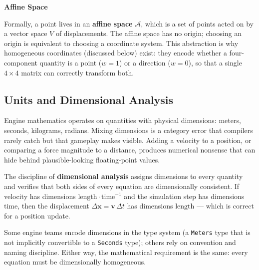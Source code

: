 \documentclass[
  11pt,
  letterpaper,
  DIV=11,
  numbers=noendperiod,
  twoside,
  open=right]{scrreprt}
\begin{document}
\begin{tcolorbox}[enhanced jigsaw, arc=.35mm, bottomrule=.15mm, breakable, colback=white, colframe=quarto-callout-note-color-frame, left=2mm, leftrule=.75mm, opacityback=0, rightrule=.15mm, toprule=.15mm]
\begin{minipage}[t]{5.5mm}
\textcolor{quarto-callout-note-color}{\faInfo}
\end{minipage}%
\begin{minipage}[t]{\textwidth - 5.5mm}

\vspace{-3mm}\textbf{Affine Space}\vspace{3mm}

Formally, a point lives in an \textbf{affine space} \(\mathcal{A}\),
which is a set of points acted on by a vector space \(V\) of
displacements. The affine space has no origin; choosing an origin is
equivalent to choosing a coordinate system. This abstraction is why
homogeneous coordinates (discussed below) exist: they encode whether a
four-component quantity is a point (\(w = 1\)) or a direction
(\(w = 0\)), so that a single \(4 \times 4\) matrix can correctly
transform both.

\end{minipage}%
\end{tcolorbox}

\subsection{Units and Dimensional
Analysis}\label{units-and-dimensional-analysis}

Engine mathematics operates on quantities with physical dimensions:
meters, seconds, kilograms, radians. Mixing dimensions is a category
error that compilers rarely catch but that gameplay makes visible.
Adding a velocity to a position, or comparing a force magnitude to a
distance, produces numerical nonsense that can hide behind
plausible-looking floating-point values.

The discipline of \textbf{dimensional analysis} assigns dimensions to
every quantity and verifies that both sides of every equation are
dimensionally consistent. If velocity has dimensions
\(\text{length} \cdot \text{time}^{-1}\) and the simulation step has
dimensions \(\text{time}\), then the displacement
\(\Delta \mathbf{x} = \mathbf{v} \, \Delta t\) has dimensions
\(\text{length}\) --- which is correct for a position update.

Some engine teams encode dimensions in the type system (a
\texttt{Meters} type that is not implicitly convertible to a
\texttt{Seconds} type); others rely on convention and naming discipline.
Either way, the mathematical requirement is the same: every equation
must be dimensionally homogeneous.
\end{document}
